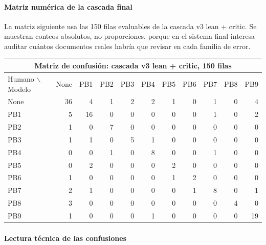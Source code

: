 \paragraph*{Matriz numérica de la cascada final}

La matriz siguiente usa las 150 filas evaluables de la cascada v3 lean + critic. Se muestran conteos absolutos, no proporciones, porque en el sistema final interesa auditar cuántos documentos reales habría que revisar en cada familia de error.

\begin{center}
\tiny
\setlength{\tabcolsep}{2.6pt}
\renewcommand{\arraystretch}{1.08}
\begin{tabular}{lrrrrrrrrrr}
\toprule
\multicolumn{11}{c}{\textbf{Matriz de confusión: cascada v3 lean + critic, 150 filas}} \\
\midrule
Humano $\backslash$ Modelo & None & PB1 & PB2 & PB3 & PB4 & PB5 & PB6 & PB7 & PB8 & PB9 \\
\midrule
None & 36 & 4 & 1 & 2 & 2 & 1 & 0 & 1 & 0 & 4 \\
PB1  & 5  & 16 & 0 & 0 & 0 & 0 & 0 & 1 & 0 & 2 \\
PB2  & 1  & 0 & 7 & 0 & 0 & 0 & 0 & 0 & 0 & 0 \\
PB3  & 1  & 1 & 0 & 5 & 1 & 0 & 0 & 0 & 0 & 0 \\
PB4  & 0  & 0 & 1 & 0 & 8 & 0 & 0 & 1 & 0 & 0 \\
PB5  & 0  & 2 & 0 & 0 & 0 & 2 & 0 & 0 & 0 & 0 \\
PB6  & 1  & 0 & 0 & 0 & 0 & 1 & 2 & 0 & 0 & 0 \\
PB7  & 2  & 1 & 0 & 0 & 0 & 0 & 1 & 8 & 0 & 1 \\
PB8  & 3  & 0 & 0 & 0 & 0 & 0 & 0 & 0 & 4 & 0 \\
PB9  & 1  & 0 & 0 & 0 & 1 & 0 & 0 & 0 & 0 & 19 \\
\bottomrule
\end{tabular}
\end{center}

\paragraph*{Lectura técnica de las confusiones}

